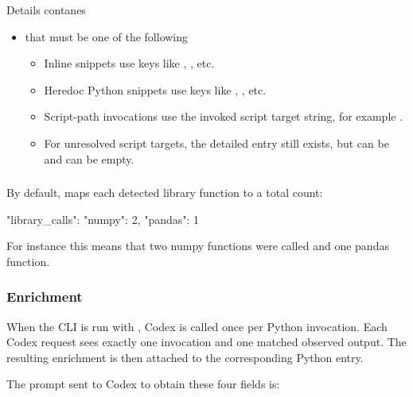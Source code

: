 \documentclass[11pt]{article}
\begin{document}
Details contanes
\begin{itemize}
\item {} that must be one of the following
  \begin{itemize}
  \item Inline  snippets use keys like , , etc.
  \item Heredoc Python snippets use keys like , , etc.
  \item Script-path invocations use the invoked script target string, for example .
  \item For unresolved script targets, the detailed entry still exists, but  can be  and  can be empty.  
  \end{itemize}
\end{itemize}

\subsubsection*{}

By default,  maps each detected library function to a total count:

\begin{DocCode}
"library_calls": {
  "numpy": 2,
  "pandas": 1
}
\end{DocCode}
For instance this means that two numpy functions were called and one pandas function.



\subsubsection*{ Enrichment}

When the CLI is run with , Codex is called once per Python invocation.
Each Codex request sees exactly one invocation and one matched observed output.
The resulting enrichment is then attached to the corresponding Python  entry.

The prompt sent to Codex to obtain these four fields is:
\end{document}
